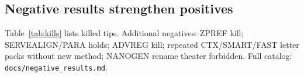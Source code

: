

\subsection{Negative results strengthen positives}
Table~\ref{tab:kills} lists killed tips.
Additional negatives: ZPREF kill; SERVEALIGN/PARA holds; ADVREG kill;
repeated CTX/SMART/FAST letter packs without new method; NANOGEN rename theater
forbidden.
Full catalog: \texttt{docs/negative\_results.md}.


